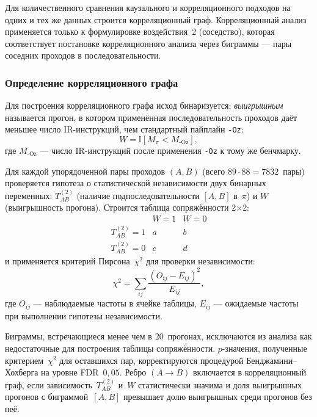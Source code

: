 Для количественного сравнения каузального и корреляционного подходов на одних и тех же данных строится корреляционный граф. Корреляционный анализ применяется только к формулировке воздействия~2 (соседство), которая соответствует постановке корреляционного анализа через биграммы --- пары соседних проходов в последовательности.

\subsubsection{Определение корреляционного графа}

Для построения корреляционного графа исход бинаризуется: \emph{выигрышным} называется прогон, в котором применённая последовательность проходов даёт меньшее число IR-инструкций, чем стандартный пайплайн \texttt{-Oz}:
\begin{equation*}
    W = \mathbb{I}[M_\pi < M_{\text{-Oz}}],
\end{equation*}
где $M_{\text{-Oz}}$ --- число IR-инструкций после применения \texttt{-Oz} к тому же бенчмарку.

Для каждой упорядоченной пары проходов $(A, B)$ (всего $89 \cdot 88 = 7832$~пары) проверяется гипотеза о статистической независимости двух бинарных переменных: $T_{AB}^{(2)}$ (наличие подпоследовательности $[A, B]$ в~$\pi$) и $W$ (выигрышность прогона). Строится таблица сопряжённости 2$\times$2:
\begin{equation*}
    \begin{array}{c|cc}
        & W = 1 & W = 0 \\
        \hline
        T_{AB}^{(2)} = 1 & a & b \\
        T_{AB}^{(2)} = 0 & c & d
    \end{array}
\end{equation*}
и применяется критерий Пирсона~$\chi^2$ для проверки независимости:
\begin{equation*}
    \chi^2 = \sum_{ij} \frac{(O_{ij} - E_{ij})^2}{E_{ij}},
\end{equation*}
где $O_{ij}$ --- наблюдаемые частоты в ячейке таблицы, $E_{ij}$ --- ожидаемые частоты при выполнении гипотезы независимости.

Биграммы, встречающиеся менее чем в 20~прогонах, исключаются из анализа как недостаточные для построения таблицы сопряжённости. $p$-значения, полученные критерием~$\chi^2$ для оставшихся пар, корректируются процедурой Бенджамини--Хохберга на уровне FDR~$0{,}05$. Ребро $(A \to B)$ включается в корреляционный граф, если зависимость~$T_{AB}^{(2)}$ и~$W$ статистически значима и доля выигрышных прогонов с биграммой~$[A, B]$ превышает долю выигрышных среди прогонов без неё.

